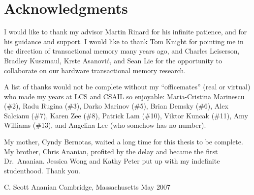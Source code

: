 \clearpage
\section*{Acknowledgments}

I would like to thank my advisor Martin Rinard for his infinite
patience, and for his guidance and support.  I would like to thank Tom
Knight for pointing me in the direction of transactional memory many
years ago, and Charles Leiserson, Bradley Kuszmaul, Krste Asanovi\'c,
and Sean Lie for the opportunity to collaborate on our
hardware transactional memory research.

A list of thanks would not be complete without
my ``officemates'' (real or virtual) who made my
years at LCS and CSAIL so enjoyable: Maria-Cristina Marinescu (\#2),
Radu Rugina (\#3), Darko Marinov (\#5), Brian Demsky (\#6), Alex
Salcianu (\#7), Karen Zee (\#8), Patrick Lam (\#10), Viktor Kuncak (\#11), 
Amy Williams (\#13), and Angelina Lee (who somehow has no number).

My mother, Cyndy Bernotas, waited a long time for this thesis to be
complete.  My brother, Chris Ananian, profited by the delay and became
the first Dr.~Ananian.  Jessica Wong and Kathy Peter put up with my
indefinite studenthood.  Thank you.

\begin{flushright}
C. Scott Ananian\tight
Cambridge, Massachusetts\tight
May 2007
\end{flushright}

